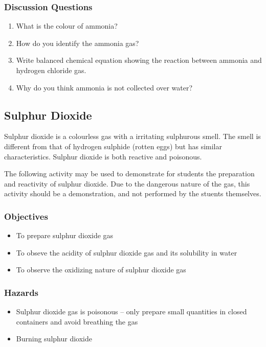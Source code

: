 \subsubsection*{Discussion Questions}
\begin{enumerate}
\item{What is the colour of ammonia?}
\item{How do you identify the ammonia gas?}
\item{Write balanced chemical equation showing the reaction between ammonia and hydrogen chloride gas.}
\item{Why do you think ammonia is not collected over water?}
\end{enumerate}

\subsection{Sulphur Dioxide}

Sulphur dioxide is a colourless gas with a irritating sulphurous smell. The smell is different from that of hydrogen sulphide (rotten eggs) but has similar characteristics. Sulphur dioxide is both reactive and poisonous.

The following activity may be used to demonstrate for students the preparation and reactivity of sulphur dioxide. Due to the dangerous nature of the gas, this activity should be a demonstration, and not performed by the stuents themselves.

\subsubsection{Objectives}
\begin{itemize}
\item{To prepare sulphur dioxide gas}
\item{To obseve the acidity of sulphur dioxide gas and its solubility in water}
\item{To observe the oxidizing nature of sulphur dioxide gas}
\end{itemize}

\subsubsection{Hazards}
\begin{itemize}
\item{Sulphur dioxide gas is poisonous -- only prepare small quantities in closed containers and avoid breathing the gas}
\item{Burning sulphur dioxide}
\end{itemize}

